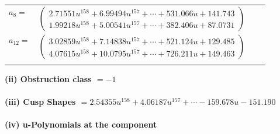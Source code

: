 \documentclass[1p]{elsarticle_modified}
\theoremstyle{definition}
\begin{document}
\begin{tabular}{m{7pt} m{180pt} m{7pt} m{180pt} }
\flushright $a_{8}=$&$\begin{pmatrix}2.71551 u^{158}+6.99494 u^{157}+\cdots+531.066 u+141.743\\1.99218 u^{158}+5.00541 u^{157}+\cdots+382.406 u+87.0731\end{pmatrix}$ \\
\flushright $a_{12}=$&$\begin{pmatrix}3.02859 u^{158}+7.14838 u^{157}+\cdots+521.124 u+129.485\\4.07615 u^{158}+10.0795 u^{157}+\cdots+726.211 u+149.463\end{pmatrix}$\\&\end{tabular}
\flushleft \textbf{(ii) Obstruction class $= -1$}\\~\\
\flushleft \textbf{(iii) Cusp Shapes $= 2.54355 u^{158}+4.06187 u^{157}+\cdots-159.678 u-151.190$}\\~\\
\newpage\renewcommand{\arraystretch}{1}
\flushleft \textbf{(iv) u-Polynomials at the component}\newline \\
\end{document}
